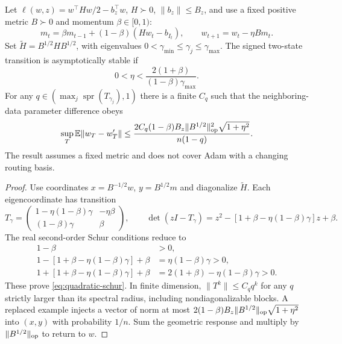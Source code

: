\begin{proposition}
\label{prop:quadratic-stability}
Let
$\ell(w,z)=w^\top H w/2-b_z^\top w$, $H\succ0$, $\|b_z\|\le B_z$,
and use a fixed positive metric $B\succ0$ and momentum $\beta\in[0,1)$:
\begin{equation}
 m_t=\beta m_{t-1}+(1-\beta)(Hw_t-b_{I_t}),\qquad
 w_{t+1}=w_t-\eta Bm_t.
\end{equation}
Set $\widetilde H=B^{1/2}HB^{1/2}$, with eigenvalues
$0<\gamma_{\min}\le\gamma_j\le\gamma_{\max}$.
The signed two-state transition is asymptotically stable if
\begin{equation}
 0<\eta<\frac{2(1+\beta)}{(1-\beta)\gamma_{\max}}.\label{eq:quadratic-schur}
\end{equation}
For any $q\in(\max_j\operatorname{spr}(T_{\gamma_j}),1)$ there is a
finite $C_q$ such that the neighboring-data parameter difference obeys
\begin{equation}
 \sup_T\mathbb E\|w_T-w_T'\|
 \le\frac{2C_q(1-\beta)B_z\|B^{1/2}\|_{\rm op}^2
                           \sqrt{1+\eta^2}}
                         {n(1-q)}.\label{eq:quadratic-generalization}
\end{equation}
The result assumes a fixed metric and does not cover Adam with a changing
routing basis.
\end{proposition}
\begin{proof}
Use coordinates $x=B^{-1/2}w$, $y=B^{1/2}m$ and diagonalize
$\widetilde H$. Each eigencoordinate has transition
\begin{equation}
 T_\gamma=\begin{pmatrix}
 1-\eta(1-\beta)\gamma&-\eta\beta\\
 (1-\beta)\gamma&\beta
 \end{pmatrix},\qquad
 \det(zI-T_\gamma)=z^2-[1+\beta-\eta(1-\beta)\gamma]z+\beta.
\end{equation}
The real second-order Schur conditions reduce to
\begin{align}
 1-\beta&>0,\\
 1-[1+\beta-\eta(1-\beta)\gamma]+\beta
 &=\eta(1-\beta)\gamma>0,\\
 1+[1+\beta-\eta(1-\beta)\gamma]+\beta
 &=2(1+\beta)-\eta(1-\beta)\gamma>0.
\end{align}
These prove \eqref{eq:quadratic-schur}. In finite dimension,
$\|T^k\|\le C_qq^k$ for any $q$ strictly larger than its spectral radius,
including nondiagonalizable blocks. A replaced example injects a vector
of norm at most
$2(1-\beta)B_z\|B^{1/2}\|_{\rm op}\sqrt{1+\eta^2}$ into $(x,y)$
with probability $1/n$. Sum the geometric response and multiply by
$\|B^{1/2}\|_{\rm op}$ to return to $w$.
\end{proof}

